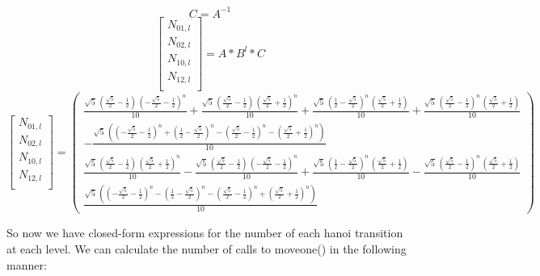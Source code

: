 \documentclass[11pt, letterpaper]{article}
\begin{document}
\begin{enumerate}[label=(\alph*)]
\[
C = A^{-1}
\]
\[
\begin{bmatrix}
N_{01, l} \\
N_{02, l} \\
N_{10, l} \\
N_{12, l} \\
\end{bmatrix}
= A*B^l*C 
\]
\[
\begin{bmatrix}
N_{01, l} \\
N_{02, l} \\
N_{10, l} \\
N_{12, l} \\
\end{bmatrix}
= 
\left(\begin{array}{c} \frac{\sqrt{5}\,\left(\frac{\sqrt{5}}{2}-\frac{1}{2}\right)\,{\left(-\frac{\sqrt{5}}{2}-\frac{1}{2}\right)}^n}{10}+\frac{\sqrt{5}\,\left(\frac{\sqrt{5}}{2}-\frac{1}{2}\right)\,{\left(\frac{\sqrt{5}}{2}+\frac{1}{2}\right)}^n}{10}+\frac{\sqrt{5}\,{\left(\frac{1}{2}-\frac{\sqrt{5}}{2}\right)}^n\,\left(\frac{\sqrt{5}}{2}+\frac{1}{2}\right)}{10}+\frac{\sqrt{5}\,{\left(\frac{\sqrt{5}}{2}-\frac{1}{2}\right)}^n\,\left(\frac{\sqrt{5}}{2}+\frac{1}{2}\right)}{10}\\ -\frac{\sqrt{5}\,\left({\left(-\frac{\sqrt{5}}{2}-\frac{1}{2}\right)}^n+{\left(\frac{1}{2}-\frac{\sqrt{5}}{2}\right)}^n-{\left(\frac{\sqrt{5}}{2}-\frac{1}{2}\right)}^n-{\left(\frac{\sqrt{5}}{2}+\frac{1}{2}\right)}^n\right)}{10}\\ \frac{\sqrt{5}\,\left(\frac{\sqrt{5}}{2}-\frac{1}{2}\right)\,{\left(\frac{\sqrt{5}}{2}+\frac{1}{2}\right)}^n}{10}-\frac{\sqrt{5}\,\left(\frac{\sqrt{5}}{2}-\frac{1}{2}\right)\,{\left(-\frac{\sqrt{5}}{2}-\frac{1}{2}\right)}^n}{10}+\frac{\sqrt{5}\,{\left(\frac{1}{2}-\frac{\sqrt{5}}{2}\right)}^n\,\left(\frac{\sqrt{5}}{2}+\frac{1}{2}\right)}{10}-\frac{\sqrt{5}\,{\left(\frac{\sqrt{5}}{2}-\frac{1}{2}\right)}^n\,\left(\frac{\sqrt{5}}{2}+\frac{1}{2}\right)}{10}\\ \frac{\sqrt{5}\,\left({\left(-\frac{\sqrt{5}}{2}-\frac{1}{2}\right)}^n-{\left(\frac{1}{2}-\frac{\sqrt{5}}{2}\right)}^n-{\left(\frac{\sqrt{5}}{2}-\frac{1}{2}\right)}^n+{\left(\frac{\sqrt{5}}{2}+\frac{1}{2}\right)}^n\right)}{10} \end{array}\right)
\]

\quad So now we have closed-form expressions for the number of each hanoi transition at each level. We can calculate the number of calls to moveone() in the following manner:

\pagebreak


\end{enumerate}
\end{document}
